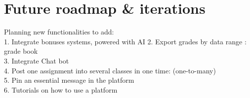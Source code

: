 \chapter{Future roadmap & iterations}\label{ch:C}
Planning new functionalities to add:\\
1. Integrate bonuses systems, powered with AI
2. Export grades by data range : grade book\\
3. Integrate Chat bot\\
4. Post one assignment into several classes in one time: (one-to-many)\\
5. Pin an essential message in the platform\\
6. Tutorials on how to use a platform
    
    
